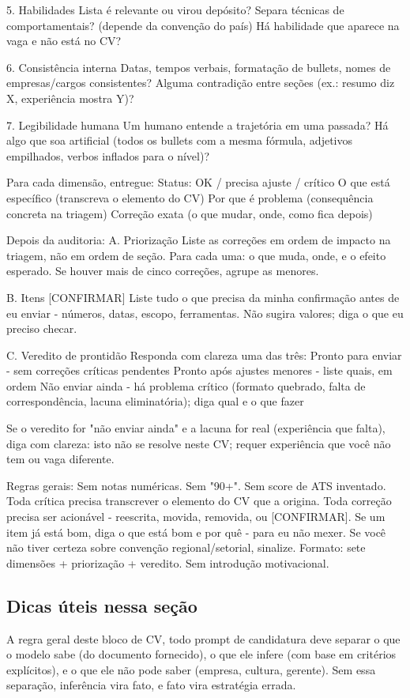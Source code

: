 \documentclass[11pt, a4paper]{article}
\begin{document}
\begin{promptbox}
5. Habilidades
 Lista é relevante ou virou depósito?
 Separa técnicas de comportamentais? (depende da convenção do país)
 Há habilidade que aparece na vaga e não está no CV?

6. Consistência interna
 Datas, tempos verbais, formatação de bullets, nomes de empresas/cargos consistentes?
 Alguma contradição entre seções (ex.: resumo diz X, experiência mostra Y)?
	
7. Legibilidade humana
 Um humano entende a trajetória em uma passada?
 Há algo que soa artificial (todos os bullets com a mesma fórmula, adjetivos empilhados, verbos inflados para o nível)?
	
Para cada dimensão, entregue:
 Status: OK / precisa ajuste / crítico
 O que está específico (transcreva o elemento do CV)
 Por que é problema (consequência concreta na triagem)
 Correção exata (o que mudar, onde, como fica depois)
	
Depois da auditoria:
 A. Priorização
  Liste as correções em ordem de impacto na triagem, não em ordem de seção. Para cada uma: o que muda, onde, e o efeito esperado. Se houver mais de cinco correções, agrupe as menores.

 B. Itens [CONFIRMAR]
  Liste tudo o que precisa da minha confirmação antes de eu enviar - números, datas, escopo, ferramentas. Não sugira valores; diga o que eu preciso checar.
 
 C. Veredito de prontidão
  Responda com clareza uma das três:
   Pronto para enviar - sem correções críticas pendentes
   Pronto após ajustes menores - liste quais, em ordem
   Não enviar ainda - há problema crítico (formato quebrado, falta de correspondência, lacuna eliminatória); diga qual e o que fazer
	
 Se o veredito for "não enviar ainda" e a lacuna for real (experiência que falta), diga com clareza: isto não se resolve neste CV; requer experiência que você não tem ou vaga diferente.
	
Regras gerais:
 Sem notas numéricas. Sem "90+". Sem score de ATS inventado.
 Toda crítica precisa transcrever o elemento do CV que a origina.
 Toda correção precisa ser acionável - reescrita, movida, removida, ou [CONFIRMAR].
 Se um item já está bom, diga o que está bom e por quê - para eu não mexer.
 Se você não tiver certeza sobre convenção regional/setorial, sinalize.
 Formato: sete dimensões + priorização + veredito. Sem introdução motivacional.
\end{promptbox}

\subsection*{Dicas úteis nessa seção}
A regra geral deste bloco de CV, todo prompt de candidatura deve separar o que o modelo sabe (do documento fornecido), o que ele infere (com base em critérios explícitos), e o que ele não pode saber (empresa, cultura, gerente). Sem essa separação, inferência vira fato, e fato vira estratégia errada.
\end{document}
